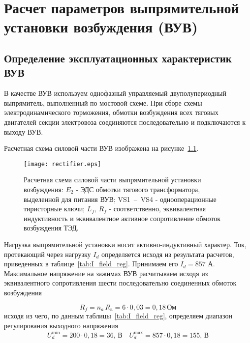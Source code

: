 \chapter{Расчет параметров выпрямительной установки возбуждения (ВУВ)}
\section{Определение эксплуатационных характеристик ВУВ}

В качестве ВУВ используем однофазный управляемый двуполупериодный выпрямитель, выполненный по мостовой схеме. При сборе схемы электродинамического торможения, обмотки возбуждения всех тяговых двигателей секции электровоза соединяются последовательно и подключаются к выходу ВУВ. 

Расчетная схема силовой части ВУВ изображена на рисунке~\ref{fig:vuv}.

\begin{figure}[H]
    \centering    
    \texttt{[image: rectifier.eps]}
    \caption{Расчетная схема силовой части выпрямительной установки возбуждения: $E_2$ - ЭДС обмотки тягового трансформатора, выделенной для питания ВУВ; VS1~--~VS4 - однооперационные тиристорные ключи; $L_f, \, R_f$ - соответственно, эквивалентная индуктивность и эквивалентное активное сопротивление обмоток возбуждения ТЭД.}
    \label{fig:vuv}
\end{figure}

Нагрузка выпрямительной установки носит активно-индуктивный характер. Ток, протекающий через нагрузку $I_d$ определяется исходя из результата расчетов, приведенных в таблице~\ref{tab:I_field_reg}. Принимаем его $I_d = 857$ А. Максимальное напряжение на зажимах ВУВ расчитываем исходя из эквивалентного сопротивления шести последовательно соединенных обмоток возбуждения

\begin{equation*}
 R_{f} = n_a \, R_{\text{в}} = 6 \cdot 0,03 = 0,18 \, \text{Ом}
\end{equation*}
исходя из чего, по данным таблицы~\ref{tab:I_field_reg}, определяем диапазон регулирования выходного напряжения
\begin{equation*}
 U_d^{\min} = 200 \cdot 0,18 = 36, \, \text{В} \quad U_d^{\max} = 857 \cdot 0,18 = 155, \, \text{В}
\end{equation*}


